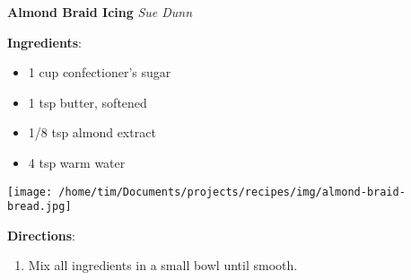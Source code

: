 \documentclass[11pt, twoside, openany]{book}
\begin{document}
\noindent\begin{minipage}[t]{\linewidth}%
{\Large\textbf{Almond Braid Icing}} \label{almond-braid-icing}\hfill\textit{Sue Dunn}\\
\noindent\begin{minipage}[t]{0.78\linewidth}%
\textbf{Ingredients}:\vspace{-3mm}
\begin{multicols}{2}
\begin{itemize}\setlength\itemsep{-1mm}
\item 1 cup confectioner's sugar
\item 1 tsp butter, softened
\item 1/8 tsp almond extract
\item 4 tsp warm water
\end{itemize}
\end{multicols}
\end{minipage}
\noindent\begin{minipage}[t]{0.18\linewidth}
\centering \strut\vspace*{-\baselineskip}\newline
\texttt{[image: /home/tim/Documents/projects/recipes/img/almond-braid-bread.jpg]}\\
\end{minipage}\vspace{3mm}
\textbf{Directions}:
\vspace{-3mm}\begin{enumerate}\setlength\itemsep{-1mm}
\item Mix all ingredients in a small bowl until smooth.
\end{enumerate}
\end{minipage}\vspace{8mm}
\end{document}
